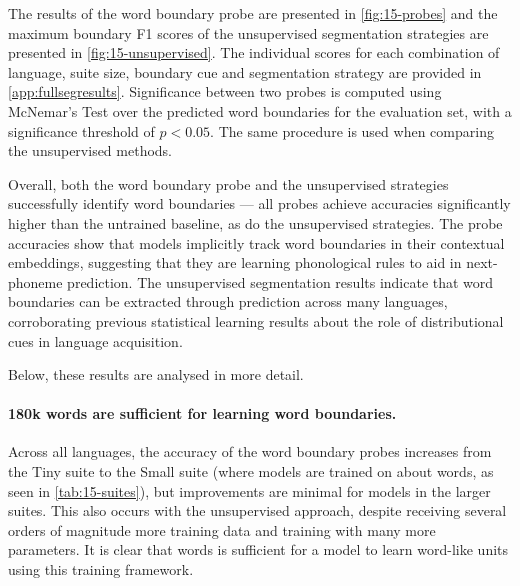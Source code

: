 
The results of the word boundary probe are presented in \cref{fig:15-probes} and the maximum boundary F1 scores of the unsupervised segmentation strategies are presented in \cref{fig:15-unsupervised}. The individual scores for each combination of language, suite size, boundary cue and segmentation strategy are provided in \cref{app:fullsegresults}. Significance between two probes is computed using McNemar's Test \citep{McNemar_1947} over the predicted word boundaries for the evaluation set, with a significance threshold of $p<0.05$. The same procedure is used when comparing the unsupervised methods.

Overall, both the word boundary probe and the unsupervised strategies successfully identify word boundaries --- all probes achieve accuracies significantly higher than the untrained baseline, as do the unsupervised strategies. The probe accuracies show that models implicitly track word boundaries in their contextual embeddings, suggesting that they are learning phonological rules to aid in next-phoneme prediction. The unsupervised segmentation results indicate that word boundaries can be extracted through prediction across many languages, corroborating previous statistical learning results about the role of distributional cues in language acquisition.

Below, these results are analysed in more detail.

\paragraph{180k words are sufficient for learning word boundaries.}
Across all languages, the accuracy of the word boundary probes increases from the Tiny suite to the Small suite (where models are trained on about  words, as seen in \cref{tab:15-suites}), but improvements are minimal for models in the larger suites. This also occurs with the unsupervised approach, despite receiving several orders of magnitude more training data and training with many more parameters. It is clear that  words is sufficient for a model to learn word-like units using this training framework.

